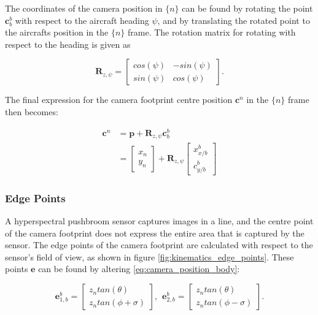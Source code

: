 The coordinates of the camera position in $\{n\}$ can be found by rotating the point $\mathbf{c}_b^b$ with respect to the aircraft heading $\psi$, and by translating the rotated point to the aircrafts position in the $\{n\}$ frame. The rotation matrix for rotating with respect to the heading is given as

\begin{equation}
	\mathbf{R}_{z,\psi} =
	\begin{bmatrix}
		cos(\psi) & -sin(\psi) \\
		sin(\psi) & cos(\psi)
	\end{bmatrix}.
\end{equation}

The final expression for the camera footprint centre position $\mathbf{c}^n$ in the $\{n\}$ frame then becomes:

\begin{equation}
\label{eq:camera_position_ned}
\begin{split}
	\mathbf{c}^n & = \mathbf{p} + \mathbf{R}_{z,\psi} \mathbf{c}_b^b \\
	& =
	\begin{bmatrix}
		x_n \\ y_n
	\end{bmatrix}
	+ \mathbf{R}_{z,\psi}
	\begin{bmatrix}
		x_{x/b}^b \\ c_{y/b}^b
	\end{bmatrix}
\end{split}
\end{equation}


\subsubsection{Edge Points}

A hyperspectral pushbroom sensor captures images in a line, and the centre point of the camera footprint does not express the entire area that is captured by the sensor. The edge points of the camera footprint are calculated with respect to the sensor's field of view, as shown in figure \ref{fig:kinematics_edge_points}. These points $\mathbf{e}$ can be found by altering \ref{eq:camera_position_body}:

\begin{equation}
	\mathbf{e}_{1,b}^b =
	\begin{bmatrix}
		z_n tan(\theta) \\ z_n tan(\phi + \sigma)
	\end{bmatrix}
	, \hspace{5pt}
	\mathbf{e}_{2,b}^b =
	\begin{bmatrix}
		z_n tan(\theta) \\ z_n tan(\phi - \sigma)
	\end{bmatrix}.
\end{equation}

